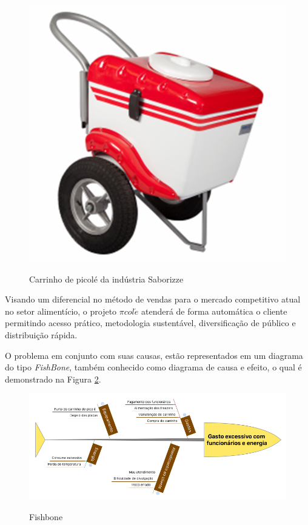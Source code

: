 \begin{figure}[htb]
	\centering
    \includegraphics[scale=0.3]{figuras/carrinho}
    \label{fig:carrinho}
    \caption{Carrinho de picolé da indústria Saborizze}
\end{figure}


Visando um diferencial no método de vendas para o mercado competitivo atual no setor alimentício, o projeto $\pi col\acute{e}$ atenderá de forma automática o cliente permitindo acesso prático, metodologia sustentável, diversificação de público e distribuição rápida.

O problema em conjunto com suas causas, estão representados em um diagrama do tipo \textit{FishBone}, também conhecido como diagrama de causa e efeito, o qual é demonstrado na Figura \ref{fig:fishbone}. 

\begin{figure}[htb]
	\centering
    \includegraphics[keepaspectratio=true,scale=0.4]{figuras/fishbone}
    \label{fig:fishbone}
    \caption{Fishbone}
\end{figure}


